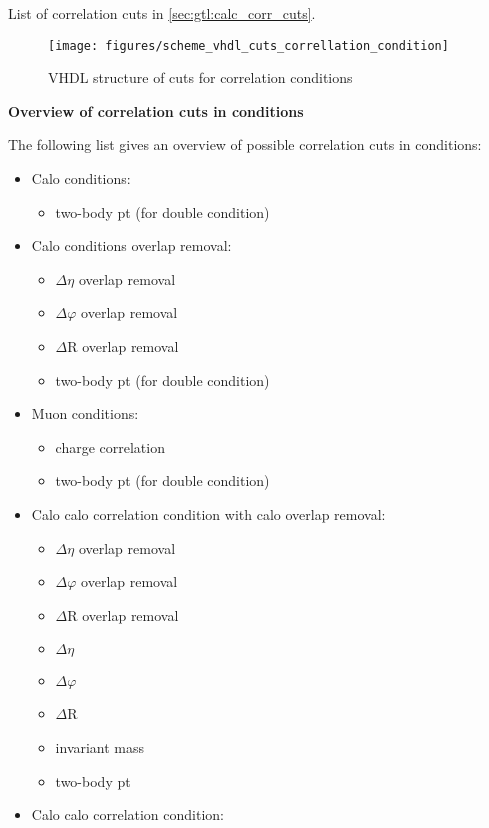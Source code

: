 List of correlation cuts in \ref{sec:gtl:calc_corr_cuts}.

\begin{figure}[htb]
\centering
\texttt{[image: figures/scheme\_vhdl\_cuts\_correllation\_condition]}
\caption{VHDL structure of cuts for correlation conditions}
\label{fig:gtl:scheme_vhdl_cuts_correllation_condition}
\end{figure}

\textbf{Overview of correlation cuts in conditions}
\label{sec:gtl:overview_correlation_cuts}

The following list gives an overview of possible correlation cuts in conditions:

\begin{itemize}
\item Calo conditions:
\begin{itemize}
\item two-body pt (for double condition)
\end{itemize}
\item Calo conditions overlap removal:
\begin{itemize}
\item $\Delta\eta$ overlap removal
\item $\Delta\varphi$ overlap removal
\item $\Delta$R overlap removal
\item two-body pt (for double condition)
\end{itemize}
\item Muon conditions:
\begin{itemize}
\item charge correlation
\item two-body pt (for double condition)
\end{itemize}
\item Calo calo correlation condition with calo overlap removal:
\begin{itemize}
\item $\Delta\eta$ overlap removal
\item $\Delta\varphi$ overlap removal
\item $\Delta$R overlap removal
\item $\Delta\eta$
\item $\Delta\varphi$
\item $\Delta$R
\item invariant mass
\item two-body pt
\end{itemize}
\item Calo calo correlation condition:

\end{itemize}
